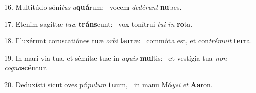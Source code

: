 16. Multitúdo sóni\textit{tus} \textit{a}\textbf{quá}rum: \ast\  vocem \textit{de}\textit{dé}\textit{runt} \textbf{nu}bes.\

17. Etenim sagíttæ \textit{tu}\textit{æ} \textbf{tráns}eunt: \ast\  vox tonítrui \textit{tu}\textit{i} \textit{in} \textbf{ro}ta.\

18. Illuxérunt coruscatiónes tuæ \textit{or}\textit{bi} \textbf{ter}ræ: \ast\  commóta est, et con\textit{tré}\textit{mu}\textit{it} \textbf{ter}ra.\

19. In mari via tua, et sémitæ tuæ in \textit{a}\textit{quis} \textbf{mul}tis: \ast\  et vestígia tua \textit{non} \textit{co}\textit{gno}\textbf{scén}tur.\

20. Deduxísti sicut oves pó\textit{pu}\textit{lum} \textbf{tu}um, \ast\  in manu Mó\textit{y}\textit{si} \textit{et} \textbf{A}\textbf{a}ron.\

